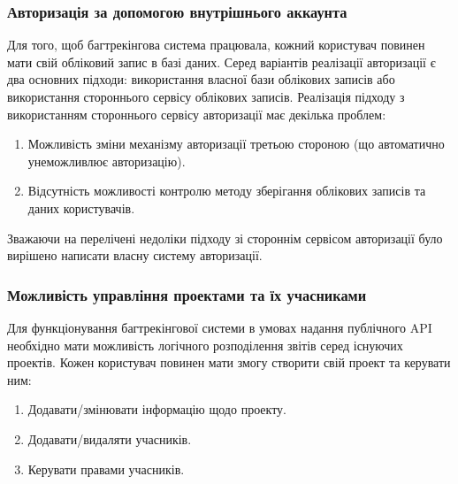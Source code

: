 \documentclass[../main.tex]{subfiles}
\begin{document}
\subsubsection{Авторизація за допомогою внутрішнього аккаунта}
Для того, щоб багтрекінгова система працювала, кожний користувач повинен мати свій обліковий запис в базі даних. Серед варіантів реалізації авторизації є два основних підходи: використання власної бази облікових записів або використання стороннього сервісу облікових записів. Реалізація підходу з використанням стороннього сервісу авторизації має декілька проблем:
\begin{enumerate}
    \item Можливість зміни механізму авторизації третьою стороною (що автоматично унеможливлює авторизацію).
    \item Відсутність можливості контролю методу зберігання облікових записів та даних користувачів.
\end{enumerate}

Зважаючи на перелічені недоліки підходу зі стороннім сервісом авторизації було вирішено написати власну систему авторизації.

\subsubsection{Можливість управління проектами та їх учасниками}
Для функціонування багтрекінгової системи в умовах надання публічного API необхідно мати можливість логічного розподілення звітів серед існуючих проектів. Кожен користувач повинен мати змогу створити свій проект та керувати ним:
\begin{enumerate}
    \item Додавати/змінювати інформацію щодо проекту.
    \item Додавати/видаляти учасників.
    \item Керувати правами учасників.
\end{enumerate}
\end{document}
